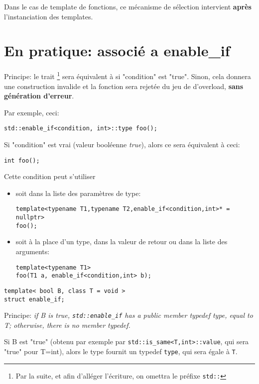 \documentclass[11pt,a4paper]{article}
\begin{document}
Dans le cas de template de fonctions, ce mécanisme de sélection intervient {\bf après} l'instanciation des templates.


\section{En pratique: associé a enable\_if}

Principe:
le trait %
\footnote{Par la suite, et afin d'alléger l'écriture, on omettra le préfixe {\tt std::}}
sera équivalent à  si "condition" est "true".
Sinon, cela donnera une construction invalide et la fonction sera rejetée du jeu de d'overload, {\bf sans génération d'erreur}.

Par exemple, ceci:
\begin{lstlisting}
std::enable_if<condition, int>::type foo();
\end{lstlisting}
Si "condition" est vrai (valeur booléenne {\em true}), alors ce sera équivalent à ceci:
\begin{lstlisting}
int foo();
\end{lstlisting}

Cette condition peut s'utiliser
\begin{itemize}
	\item soit dans la liste des paramètres de type:
\begin{lstlisting}
template<typename T1,typename T2,enable_if<condition,int>* = nullptr>
foo();
\end{lstlisting}

	\item soit à la place d'un type, dans la valeur de retour ou dans la liste des arguments:
\begin{lstlisting}
template<typename T1>
foo(T1 a, enable_if<condition,int> b);
\end{lstlisting}
	
\end{itemize}

\begin{lstlisting}
template< bool B, class T = void >
struct enable_if;
\end{lstlisting}

Principe:
{\em if B is true, {\tt std::enable\_if} has a public member typedef type, equal to T; otherwise, there is no member typedef. }

Si B est "true" (obtenu par exemple par {\tt std::is\_same<T,int>::value}, qui sera "true" pour T=int), alors le type fournit un typedef {\tt type}, qui sera égale à {\tt T}.
\end{document}
